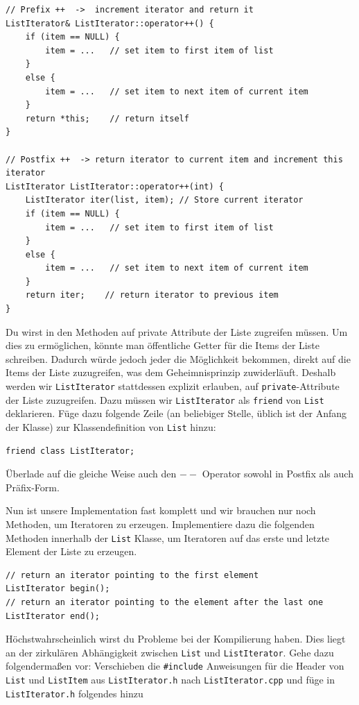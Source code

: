 \begin{lstlisting}
// Prefix ++  ->  increment iterator and return it
ListIterator& ListIterator::operator++() {
	if (item == NULL) {
		item = ...	 // set item to first item of list
	}
	else {
		item = ...	 // set item to next item of current item
	}
	return *this;	 // return itself
}

// Postfix ++  -> return iterator to current item and increment this iterator
ListIterator ListIterator::operator++(int) {
	ListIterator iter(list, item); // Store current iterator
	if (item == NULL) {
		item = ...	 // set item to first item of list
	}
	else {
		item = ...	 // set item to next item of current item
	}
	return iter; 	// return iterator to previous item
}
\end{lstlisting}

Du wirst in den Methoden auf private Attribute der Liste zugreifen müssen. Um dies zu ermöglichen, könnte man öffentliche Getter für die Items der Liste schreiben.
Dadurch würde jedoch jeder die Möglichkeit bekommen, direkt auf die Items der Liste zuzugreifen, was dem Geheimnisprinzip zuwiderläuft.
Deshalb werden wir \texttt{ListIterator} stattdessen explizit erlauben, auf \texttt{private}-Attribute der Liste zuzugreifen.
Dazu müssen wir \texttt{ListIterator} als \texttt{friend} von \texttt{List} deklarieren.
Füge dazu folgende Zeile (an beliebiger Stelle, üblich ist der Anfang der Klasse) zur Klassendefinition von \texttt{List} hinzu:
\begin{lstlisting}
friend class ListIterator;
\end{lstlisting}

Überlade auf die gleiche Weise auch den \textbf{$--$} Operator sowohl in Postfix als auch Präfix-Form.

Nun ist unsere Implementation fast komplett und wir brauchen nur noch Methoden, um Iteratoren zu erzeugen.
Implementiere dazu die folgenden Methoden innerhalb der \texttt{List} Klasse, um Iteratoren auf das erste und letzte Element der Liste zu erzeugen.
\begin{lstlisting}
// return an iterator pointing to the first element
ListIterator begin();
// return an iterator pointing to the element after the last one
ListIterator end();
\end{lstlisting}

Höchstwahrscheinlich wirst du Probleme bei der Kompilierung haben.
Dies liegt an der zirkulären Abhängigkeit zwischen \texttt{List} und \texttt{ListIterator}.
Gehe dazu folgendermaßen vor:
Verschieben die \texttt{\#include} Anweisungen für die Header von \texttt{List} und \texttt{ListItem} aus \texttt{ListIterator.h} nach \texttt{ListIterator.cpp} und füge in \texttt{ListIterator.h} folgendes hinzu

